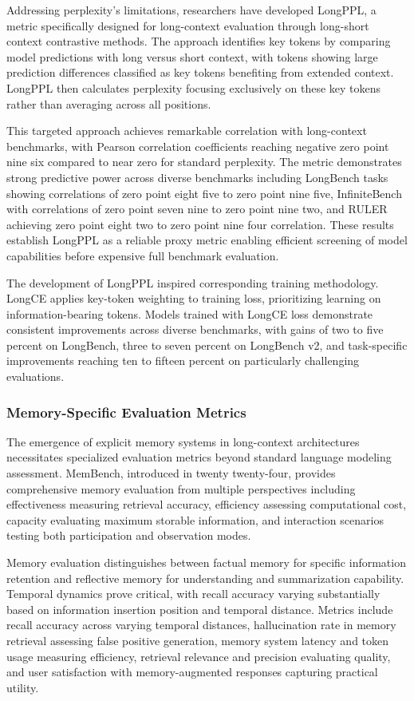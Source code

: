 \documentclass[11pt,letterpaper]{article}
\begin{document}
Addressing perplexity's limitations, researchers have developed LongPPL, a metric specifically designed for long-context evaluation through long-short context contrastive methods. The approach identifies key tokens by comparing model predictions with long versus short context, with tokens showing large prediction differences classified as key tokens benefiting from extended context. LongPPL then calculates perplexity focusing exclusively on these key tokens rather than averaging across all positions.

This targeted approach achieves remarkable correlation with long-context benchmarks, with Pearson correlation coefficients reaching negative zero point nine six compared to near zero for standard perplexity. The metric demonstrates strong predictive power across diverse benchmarks including LongBench tasks showing correlations of zero point eight five to zero point nine five, InfiniteBench with correlations of zero point seven nine to zero point nine two, and RULER achieving zero point eight two to zero point nine four correlation. These results establish LongPPL as a reliable proxy metric enabling efficient screening of model capabilities before expensive full benchmark evaluation.

The development of LongPPL inspired corresponding training methodology. LongCE applies key-token weighting to training loss, prioritizing learning on information-bearing tokens. Models trained with LongCE loss demonstrate consistent improvements across diverse benchmarks, with gains of two to five percent on LongBench, three to seven percent on LongBench v2, and task-specific improvements reaching ten to fifteen percent on particularly challenging evaluations.

\subsubsection{Memory-Specific Evaluation Metrics}

The emergence of explicit memory systems in long-context architectures necessitates specialized evaluation metrics beyond standard language modeling assessment. MemBench, introduced in twenty twenty-four, provides comprehensive memory evaluation from multiple perspectives including effectiveness measuring retrieval accuracy, efficiency assessing computational cost, capacity evaluating maximum storable information, and interaction scenarios testing both participation and observation modes.

Memory evaluation distinguishes between factual memory for specific information retention and reflective memory for understanding and summarization capability. Temporal dynamics prove critical, with recall accuracy varying substantially based on information insertion position and temporal distance. Metrics include recall accuracy across varying temporal distances, hallucination rate in memory retrieval assessing false positive generation, memory system latency and token usage measuring efficiency, retrieval relevance and precision evaluating quality, and user satisfaction with memory-augmented responses capturing practical utility.
\end{document}
